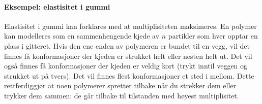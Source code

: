 \paragraph{Eksempel: elastisitet i gummi} Elastisitet i gummi kan forklares med at multiplisiteten maksimeres. En polymer kan modelleres som en sammenhengende kjede av $n$ partikler som hver opptar en plass i gitteret. Hvis den ene enden av polymeren er bundet til en vegg, vil det finnes få konformasjoner der kjeden er strukket helt eller nesten helt ut. Det vil også finnes få konformasjoner der kjeden er veldig kort (trykt inntil veggen og strukket ut på tvers). Det vil finnes flest konformasjoner et sted i mellom. Dette rettferdiggjør at noen polymerer spretter tilbake når du strekker dem eller trykker dem sammen: de går tilbake til tilstanden med høyest multiplisitet.
